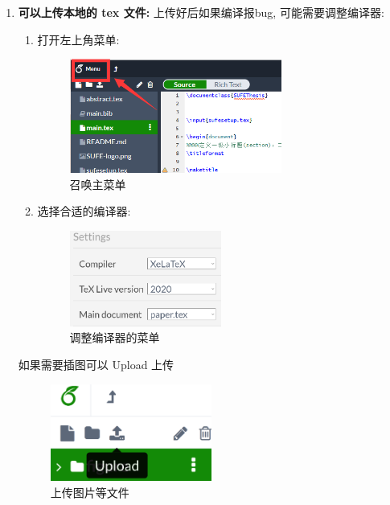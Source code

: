 \documentclass{booki}
\begin{document}
\begin{enumerate}
    \item
          \textbf{可以上传本地的 tex 文件:} 上传好后如果编译报bug, 可能需要调整编译器:
          \begin{enumerate}
              \item 打开左上角菜单:
                    \begin{figure}[H]
                        \centering
                        \includegraphics[width=0.7\textwidth]{Guidepics/20210415184001.png}
                        \caption{召唤主菜单}
                    \end{figure}
              \item 选择合适的编译器:
                    \begin{figure}[H]
                        \centering
                        \includegraphics[width=0.5\textwidth]{Guidepics/20210415183957.png}
                        \caption{调整编译器的菜单}
                    \end{figure}
          \end{enumerate}

          如果需要插图可以 Upload 上传

          \begin{figure}[H]
              \centering
              \includegraphics[width=0.5\textwidth]{Guidepics/20210415185926.png}
              \caption{上传图片等文件}
          \end{figure}


\end{enumerate}
\end{document}
